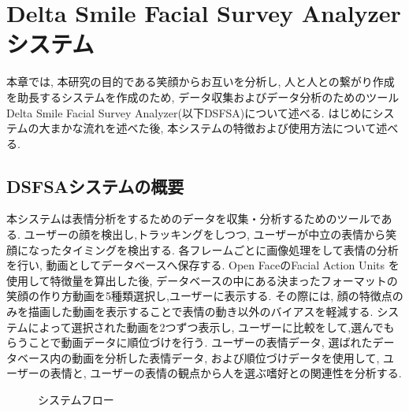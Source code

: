 \chapter{Delta Smile Facial Survey Analyzerシステム}
\label{chap:aboutDSFSA}

本章では, 本研究の目的である笑顔からお互いを分析し, 人と人との繋がり作成を助長するシステムを作成のため,
データ収集およびデータ分析のためのツールDelta Smile Facial Survey Analyzer(以下DSFSA)について述べる.
はじめにシステムの大まかな流れを述べた後, 本システムの特徴および使用方法について述べる.


\section{DSFSAシステムの概要}
本システムは表情分析をするためのデータを収集・分析するためのツールである.
ユーザーの顔を検出し,トラッキングをしつつ,
ユーザーが中立の表情から笑顔になったタイミングを検出する.
各フレームごとに画像処理をして表情の分析を行い, 動画としてデータベースへ保存する.
Open FaceのFacial Action Units を使用して特徴量を算出した後,
データベースの中にある決まったフォーマットの笑顔の作り方動画を5種類選択し,ユーザーに表示する.
その際には, 顔の特徴点のみを描画した動画を表示することで表情の動き以外のバイアスを軽減する.
システムによって選択された動画を2つずつ表示し, ユーザーに比較をして,選んでもらうことで動画データに順位づけを行う.
ユーザーの表情データ, 選ばれたデータベース内の動画を分析した表情データ, および順位づけデータを使用して,
ユーザーの表情と, ユーザーの表情の観点から人を選ぶ嗜好との関連性を分析する.

\begin{figure}[htbp]
    \begin{center}
    \end{center}
    \caption{システムフロー}
    \label{fig:system_architecture}
\end{figure}


